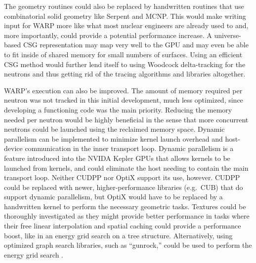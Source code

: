 \documentclass[preprint,12pt]{elsarticle}
\begin{document}
The geometry routines could also be replaced by handwritten routines that use combinatorial solid geometry like Serpent and MCNP.  This would make writing input for WARP more like what most nuclear engineers are already used to and, more importantly, could provide a potential performance increase.  A universe-based CSG representation may map very well to the GPU and may even be able to fit inside of shared memory for small numbers of surfaces.  Using an efficient CSG method would further lend itself to using Woodcock delta-tracking for the neutrons and thus getting rid of the tracing algorithms and libraries altogether.   

WARP's execution can also be improved.  The amount of memory required per neutron was not tracked in this initial development, much less optimized, since developing a functioning code was the main priority.  Reducing the memory needed per neutron would be highly beneficial in the sense that more concurrent neutrons could be launched using the reclaimed memory space.  Dynamic parallelism can be implemented to minimize kernel launch overhead and host-device communication in the inner transport loop.  Dynamic parallelism is a feature introduced into the NVIDA Kepler GPUs that allows kernels to be launched from kernels, and could eliminate the host needing to contain the main transport loop.  Neither CUDPP nor OptiX support its use, however.  CUDPP could be replaced with newer, higher-performance libraries (e.g.\ CUB) that do support dynamic parallelism, but OptiX would have to be replaced by a handwritten kernel to perform the necessary geometric tasks.  Textures could be thoroughly investigated as they might provide better performance in tasks where their free linear interpolation and spatial caching could provide a performance boost, like in an energy grid search on a tree structure.   Alternatively, using optimized graph search libraries, such as ``gunrock,'' could be used to perform the energy grid search \cite{gunrock}.

\end{document}
